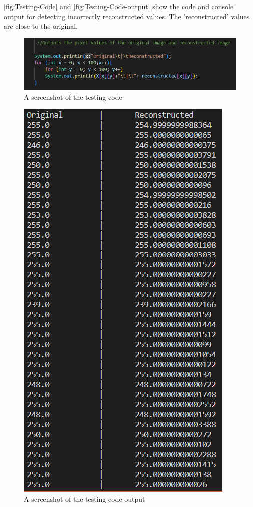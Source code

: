     \autoref{fig:Testing-Code} and \autoref{fig:Testing-Code-output} show the code and console output for detecting incorrectly reconstructed values. The 'reconstructed' values are close to the original.   
    
    \begin{figure}[H]
        \centering
        \includegraphics[width=1\columnwidth]{Figures/Week 1/W1-SimpleFT-InverseDFT-Test-1.0-code.png}
        \caption{A screenshot of the testing code}
        \label{fig:Testing-Code}
    \end{figure}
    \begin{figure}[H]
            \centering
            \includegraphics[width=.49\columnwidth]{Figures/Week 1/W1-SimpleFT-InverseDFT-Test-1.0-Output.png}
            \caption{A screenshot of the testing code output}
            \label{fig:Testing-Code-output}
        \end{figure}

